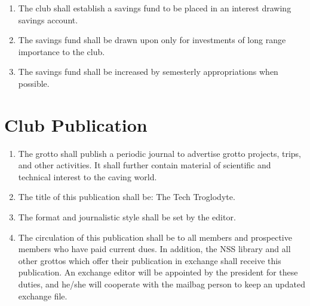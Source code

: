 \documentclass[
]{article}
\providecommand{\tightlist}{%
  \setlength{\itemsep}{0pt}\setlength{\parskip}{0pt}}
\begin{document}
\begin{enumerate}
\def\labelenumi{\arabic{enumi}.}
\tightlist
\item
  The club shall establish a savings fund to be placed in an interest
  drawing savings account.
\item
  The savings fund shall be drawn upon only for investments of long
  range importance to the club.
\item
  The savings fund shall be increased by semesterly appropriations when
  possible.
\end{enumerate}

\hypertarget{club-publication}{%
\section{Club Publication}\label{club-publication}}

\begin{enumerate}
\def\labelenumi{\arabic{enumi}.}
\tightlist
\item
  The grotto shall publish a periodic journal to advertise grotto
  projects, trips, and other activities. It shall further contain
  material of scientific and technical interest to the caving world.
\item
  The title of this publication shall be: The Tech Troglodyte.
\item
  The format and journalistic style shall be set by the editor.
\item
  The circulation of this publication shall be to all members and
  prospective members who have paid current dues. In addition, the NSS
  library and all other grottos which offer their publication in
  exchange shall receive this publication. An exchange editor will be
  appointed by the president for these duties, and he/she will cooperate
  with the mailbag person to keep an updated exchange file.
\end{enumerate}
\end{document}
